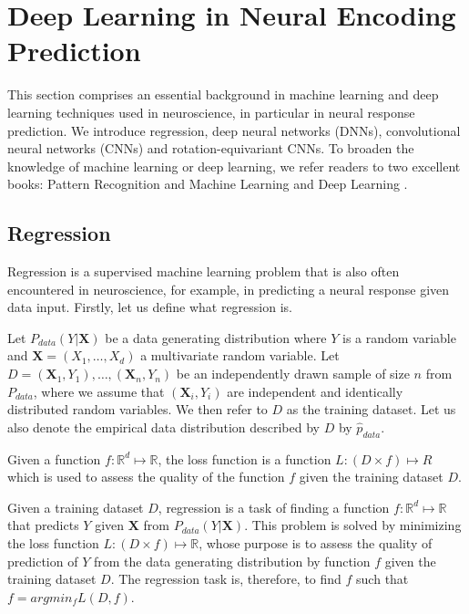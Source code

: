 \chapter{Deep Learning in Neural Encoding Prediction}

This section comprises an essential background in machine learning and deep learning techniques used in neuroscience, in particular in neural response prediction. We introduce regression, deep neural networks (DNNs), convolutional neural networks (CNNs) and rotation-equivariant CNNs. To broaden the knowledge of machine learning or deep learning, we refer readers to two excellent books: Pattern Recognition and Machine Learning \citep{bishop2006pattern} and Deep Learning \citep{Goodfellow-et-al-2016}.

\section{Regression}

Regression is a supervised machine learning problem that is also often encountered in neuroscience, for example, in predicting a neural response given data input. Firstly, let us define what regression is.

\begin{defn}\label{def01:1}
	Let $P_{data}(Y|\textbf{X})$ be a data generating distribution where $Y$ is a random variable and $\textbf{X} = (X_1, … , X_d)$ a multivariate random variable. Let $D = {(\textbf{X}_1, Y_1), \dots, (\textbf{X}_n, Y_n)}$ be an independently drawn sample of size $n$ from $P_{data}$, where we assume that $(\textbf{X}_i, Y_i)$ are independent and identically distributed random variables. We then refer to $D$ as the training dataset. Let us also denote the empirical data distribution described by $D$ by $\hat{p}_{data}$.
\end{defn}

\begin{defn}\label{def01:2}
Given a function $f: \mathbb{R}^d \mapsto \mathbb{R}$, the loss function is a function $L: (D \times f) \mapsto R$ which is used to assess the quality of the function $f$ given the training dataset $D$.
\end{defn}

\begin{defn}[Regression]\label{def01:3}
Given a training dataset $D$, regression is a task of finding a function $f: \mathbb{R}^d \mapsto \mathbb{R}$ that predicts $Y$ given $\textbf{X}$ from $P_{data}(Y|\textbf{X})$. This problem is solved by minimizing the loss function $L: (D \times f) \mapsto \mathbb{R}$, whose purpose is to assess the quality of prediction of $Y$ from the data generating distribution by function $f$ given the training dataset $D$. The regression task is, therefore, to find $f$ such that $f = argmin_f L(D, f)$. 
\end{defn}

